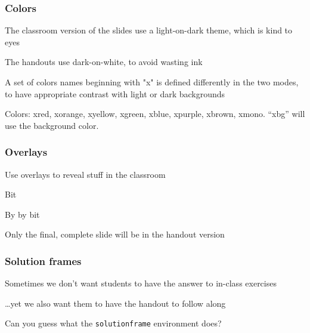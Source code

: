 \documentclass[aspectratio=169,handout]{beamer}
\begin{document}
\begin{frame}
	\frametitle{Colors}
	\begin{witem}
		\item The classroom version of the slides use a light-on-dark theme,
			which is kind to eyes
		\item The handouts use dark-on-white, to avoid wasting ink
        \item A set of colors names beginning with "x" is defined differently
            in the two modes, to have appropriate contrast with light or dark
            backgrounds
        \item Colors: {\color{xred} xred},
             {\color{xorange} xorange},
             {\color{xyellow} xyellow},
             {\color{xgreen} xgreen},
             {\color{xblue} xblue},
             {\color{xpurple} xpurple},
             {\color{xbrown} xbrown},
             {\color{xmono} xmono}. ``xbg'' will use the background color.
	\end{witem}
\end{frame}





\begin{frame}
	\frametitle{Overlays}
	\begin{witemplus}
		\item Use overlays to reveal stuff in the classroom
		\item Bit
		\item By by bit
		\item Only the final, complete slide will be in the handout version
	\end{witemplus}
\end{frame}


\begin{frame}
	\frametitle{Solution frames}
	\begin{witem}
		\item Sometimes we don't want students to have the answer to
			in-class exercises
		\item \dots yet we also want them to have the handout to follow along
		\item Can you guess what the \texttt{solutionframe} environment does?
	\end{witem}
\end{frame}
\end{document}
